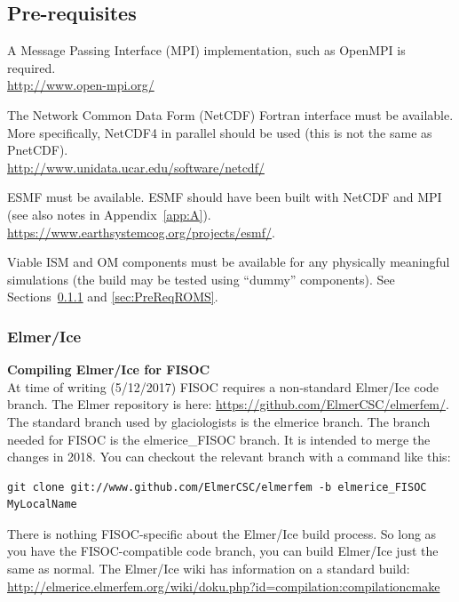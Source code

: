 \documentclass[12pt]{article}
\begin{document}
\subsection{Pre-requisites}
\label{sec:PreReq}

A Message Passing Interface (MPI) implementation, such as 
OpenMPI is required.\\
 \url{http://www.open-mpi.org/}

The Network Common Data Form (NetCDF) Fortran interface must be available. 
More specifically, NetCDF4 in parallel should be used (this is not the same as PnetCDF). \\
\url{http://www.unidata.ucar.edu/software/netcdf/}

ESMF must be available. ESMF should have been built with NetCDF and MPI 
(see also notes in Appendix~\ref{app:A}). \\
\url{https://www.earthsystemcog.org/projects/esmf/}.


Viable ISM and OM components must be available for any physically meaningful simulations
(the build may be tested using ``dummy'' components).  
See Sections~\ref{sec:PreReqElmer} and \ref{sec:PreReqROMS}.


\subsubsection{Elmer/Ice}
\label{sec:PreReqElmer}

\textbf{Compiling Elmer/Ice for FISOC} \\
At time of writing (5/12/2017) FISOC requires a non-standard Elmer/Ice 
code branch. 
The Elmer repository is here:
\url{https://github.com/ElmerCSC/elmerfem/}.
The standard branch used by glaciologists is the elmerice branch. 
The branch needed for FISOC is the elmerice\_FISOC branch. 
It is intended to merge the changes in 2018.
You can checkout the relevant branch with a command like this:
\begin{lstlisting}
git clone git://www.github.com/ElmerCSC/elmerfem -b elmerice_FISOC MyLocalName
\end{lstlisting}

There is nothing FISOC-specific about the Elmer/Ice build process.  
So long as you have the FISOC-compatible code branch, you can build Elmer/Ice 
just the same as normal. 
The Elmer/Ice wiki has information on a standard build:
\url{http://elmerice.elmerfem.org/wiki/doku.php?id=compilation:compilationcmake}
\end{document}
